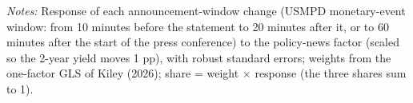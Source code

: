 \begin{table}[tp]\centering\small
\caption{Market-Index Weights from Policy News}\label{tab:weights}
\begin{flushleft}\footnotesize\textit{Notes:} Response of each announcement-window change (USMPD monetary-event window: from 10 minutes before the statement to 20 minutes after it, or to 60 minutes after the start of the press conference) to the policy-news factor (scaled so the 2-year yield moves 1 pp), with robust standard errors; weights from the one-factor GLS of Kiley (2026); share = weight $\times$ response (the three shares sum to 1).\end{flushleft}
\end{table}
